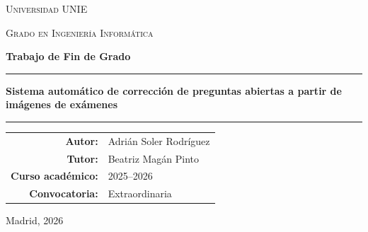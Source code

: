 \documentclass[12pt,a4paper]{report}
\begin{document}
\begin{titlepage}
  \centering
  \vspace*{1cm}
  {\scshape\large Universidad UNIE\par}
  {\scshape Grado en Ingeniería Informática\par}
  \vspace{2.2cm}
  {\Large\bfseries Trabajo de Fin de Grado\par}
  \vspace{1.2cm}
  \rule{\linewidth}{0.4pt}\par\vspace{0.5cm}
  {\LARGE\bfseries Sistema automático de corrección de preguntas abiertas a partir de imágenes de exámenes\par}
  \vspace{0.5cm}
  \rule{\linewidth}{0.4pt}\par
  \vspace{2.2cm}
  \begin{flushright}
    \begin{tabular}{rl}
      \textbf{Autor:} & Adrián Soler Rodríguez\\[0.3cm]
      \textbf{Tutor:} & Beatriz Magán Pinto\\[0.3cm]
      \textbf{Curso académico:} & 2025--2026\\[0.3cm]
      \textbf{Convocatoria:} & Extraordinaria\\
    \end{tabular}
  \end{flushright}
  \vfill
  {\large Madrid, 2026\par}
\end{titlepage}

\setcounter{page}{2}



\tableofcontents
\clearpage

\setcounter{page}{1}










\end{document}
